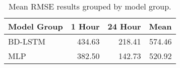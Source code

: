\begin{table}[H]
\centering
\begin{tabular}{lrrr}
\toprule
Model Group & 1 Hour & 24 Hour & Mean \\
\midrule
BD-LSTM & 434.63 & 218.41 & 574.46 \\
MLP & 382.50 & 142.73 & 520.92 \\
\bottomrule
\end{tabular}
\caption{Mean RMSE results grouped by model group.}
\label{model-group-RMSE}
\end{table}
